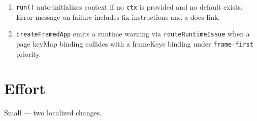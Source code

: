 \begin{enumerate}
\def\labelenumi{\arabic{enumi}.}
\tightlist
\item
  \texttt{r\allowbreak{}u\allowbreak{}n\allowbreak{}(\allowbreak{})} auto-initializes context if no \texttt{c\allowbreak{}t\allowbreak{}x} is provided and no default exists. Error message on failure includes fix instructions and a docs link.
\item
  \texttt{c\allowbreak{}r\allowbreak{}e\allowbreak{}a\allowbreak{}t\allowbreak{}e\allowbreak{}F\allowbreak{}r\allowbreak{}a\allowbreak{}m\allowbreak{}e\allowbreak{}d\allowbreak{}A\allowbreak{}p\allowbreak{}p} emits a runtime warning via \texttt{r\allowbreak{}o\allowbreak{}u\allowbreak{}t\allowbreak{}e\allowbreak{}R\allowbreak{}u\allowbreak{}n\allowbreak{}t\allowbreak{}i\allowbreak{}m\allowbreak{}e\allowbreak{}I\allowbreak{}s\allowbreak{}s\allowbreak{}u\allowbreak{}e} when a page keyMap binding collides with a frameKeys binding under \texttt{f\allowbreak{}r\allowbreak{}a\allowbreak{}m\allowbreak{}e\allowbreak{}-\allowbreak{}f\allowbreak{}i\allowbreak{}r\allowbreak{}s\allowbreak{}t} priority.
\end{enumerate}

\section{Effort}\label{record-314-effort}

Small --- two localized changes.

